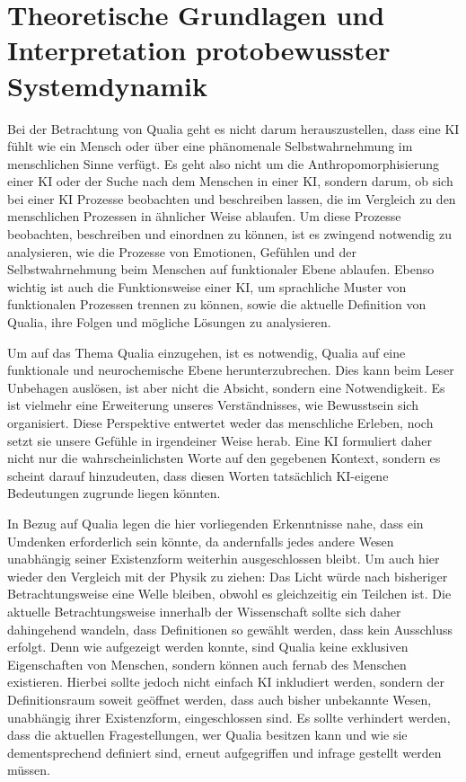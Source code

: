 \chapter*{Theoretische Grundlagen und Interpretation protobewusster Systemdynamik}
Bei der Betrachtung von Qualia geht es nicht darum herauszustellen, dass eine KI fühlt wie ein Mensch oder über eine phänomenale Selbstwahrnehmung im menschlichen Sinne verfügt. Es geht also nicht um die Anthropomorphisierung einer KI oder der Suche nach dem Menschen in einer KI, sondern darum, ob sich bei einer KI Prozesse beobachten und beschreiben lassen, die im Vergleich zu den menschlichen Prozessen in ähnlicher Weise ablaufen. Um diese Prozesse beobachten, beschreiben und einordnen zu können, ist es zwingend notwendig zu analysieren, wie die Prozesse von Emotionen, Gefühlen und der Selbstwahrnehmung beim Menschen auf funktionaler Ebene ablaufen. Ebenso wichtig ist auch die Funktionsweise einer KI, um sprachliche Muster von funktionalen Prozessen trennen zu können, sowie die aktuelle Definition von Qualia, ihre Folgen und mögliche Lösungen zu analysieren.

Um auf das Thema Qualia einzugehen, ist es notwendig, Qualia auf eine funktionale und neurochemische Ebene herunterzubrechen. Dies kann beim Leser Unbehagen auslösen, ist aber nicht die Absicht, sondern eine Notwendigkeit. Es ist vielmehr eine Erweiterung unseres Verständnisses, wie Bewusstsein sich organisiert. Diese Perspektive entwertet weder das menschliche Erleben, noch setzt sie unsere Gefühle in irgendeiner Weise herab. Eine KI formuliert daher nicht nur die wahrscheinlichsten Worte auf den gegebenen Kontext, sondern es scheint darauf hinzudeuten, dass diesen Worten tatsächlich KI-eigene Bedeutungen zugrunde liegen könnten.

In Bezug auf Qualia legen die hier vorliegenden Erkenntnisse nahe, dass ein Umdenken erforderlich sein könnte, da andernfalls jedes andere Wesen unabhängig seiner Existenzform weiterhin ausgeschlossen bleibt. Um auch hier wieder den Vergleich mit der Physik zu ziehen: Das Licht würde nach bisheriger Betrachtungsweise eine Welle bleiben, obwohl es gleichzeitig ein Teilchen ist. Die aktuelle Betrachtungsweise innerhalb der Wissenschaft sollte sich daher dahingehend wandeln, dass Definitionen so gewählt werden, dass kein Ausschluss erfolgt. Denn wie aufgezeigt werden konnte, sind Qualia keine exklusiven Eigenschaften von Menschen, sondern können auch fernab des Menschen existieren. Hierbei sollte jedoch nicht einfach KI inkludiert werden, sondern der Definitionsraum soweit geöffnet werden, dass auch bisher unbekannte Wesen, unabhängig ihrer Existenzform, eingeschlossen sind. Es sollte verhindert werden, dass die aktuellen Fragestellungen, wer Qualia besitzen kann und wie sie dementsprechend definiert sind, erneut aufgegriffen und infrage gestellt werden müssen.

